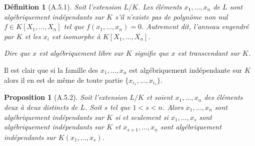 \documentclass[12pts,a4paper]{report}
\newtheorem{definition}{Définition}
\newtheorem{proposition}{Proposition}
\begin{document}
\begin{definition}[A.5.1]
Soit l'extension \( L/K \). Les éléments \( x_1, \ldots, x_n \) de \( L \) sont algébriquement indépendants sur \( K \) s'il n'existe pas de polynôme non nul \( f \in K[X_1, \ldots, X_n] \) tel que \( f(x_1, \ldots, x_n) = 0 \). Autrement dit, l'anneau engendré par \( K \) et les \( x_i \) est isomorphe à \( K[X_1, \ldots, X_n] \).

Dire que \( x \) est algébriquement libre sur \( K \) signifie que \( x \) est transcendant sur \( K \).
\end{definition}

Il est clair que si la famille des \( x_1, \ldots, x_n \) est algébriquement indépendante sur \( K \) alors il en est de même de toute partie \( \{x_{i_1}, \ldots, x_{i_s}\} \).

\begin{proposition}[A.5.2]
Soit l'extension \( L/K \) et soient \( x_1, \ldots, x_n \) des éléments deux à deux distincts de \( L \). Soit \( s \) tel que \( 1 < s < n \). Alors \( x_1, \ldots, x_n \) sont algébriquement indépendants sur \( K \) si et seulement si \( x_1, \ldots, x_s \) sont algébriquement indépendants sur \( K \) et \( x_{s+1}, \ldots, x_n \) sont algébriquement indépendants sur \( K(x_1, \ldots, x_s) \).
\end{proposition}
\end{document}

